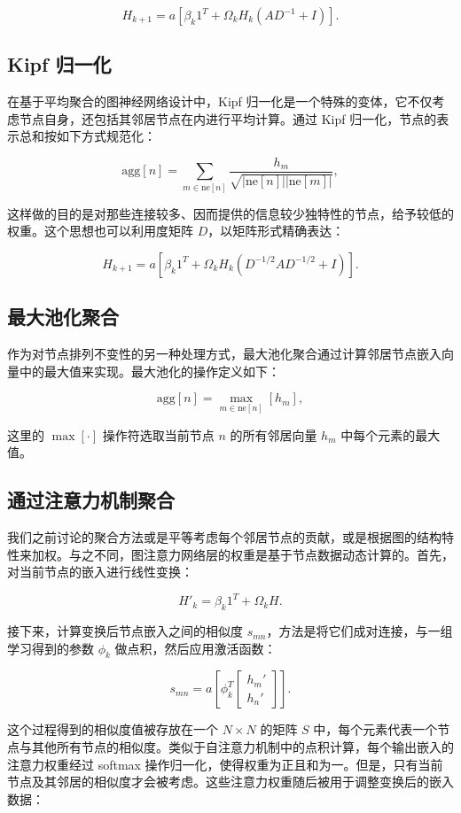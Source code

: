 \[
H_{k+1} = a \left[ \beta_k 1^T + \Omega_k H_k (AD^{-1} + I) \right]. \tag{13.18}
\]
\subsection{Kipf 归一化}
在基于平均聚合的图神经网络设计中，Kipf 归一化是一个特殊的变体，它不仅考虑节点自身，还包括其邻居节点在内进行平均计算。通过 Kipf 归一化，节点的表示总和按如下方式规范化：

\[
\text{agg}[n] = \sum_{m \in \text{ne}[n]} \frac{h_m}{\sqrt{|\text{ne}[n]||\text{ne}[m]|}}, \tag{13.19}
\]

这样做的目的是对那些连接较多、因而提供的信息较少独特性的节点，给予较低的权重。这个思想也可以利用度矩阵 \(D\)，以矩阵形式精确表达：

\[
H_{k+1} = a \left[ \beta_k 1^T + \Omega_k H_k (D^{-1/2} A D^{-1/2} + I) \right]. \tag{13.20}
\]

\subsection{最大池化聚合}
作为对节点排列不变性的另一种处理方式，最大池化聚合通过计算邻居节点嵌入向量中的最大值来实现。最大池化的操作定义如下：

\[
\text{agg}[n] = \max_{m \in \text{ne}[n]} \left[ h_m \right], \tag{13.21}
\]

这里的 \(\max[\cdot]\) 操作符选取当前节点 \(n\) 的所有邻居向量 \(h_m\) 中每个元素的最大值。

\subsection{通过注意力机制聚合}

我们之前讨论的聚合方法或是平等考虑每个邻居节点的贡献，或是根据图的结构特性来加权。与之不同，图注意力网络层的权重是基于节点数据动态计算的。首先，对当前节点的嵌入进行线性变换：

\[
H'_k = \beta_k 1^T + \Omega_k H. \tag{13.22}
\]

接下来，计算变换后节点嵌入之间的相似度 \(s_{mn}\)，方法是将它们成对连接，与一组学习得到的参数 \(\phi_k\) 做点积，然后应用激活函数：

\[
s_{mn} = a \left[ \phi_k^T \left[ \begin{array}{c}
h_m' \\
h_n'
\end{array} \right] \right]. \tag{13.23}
\]

这个过程得到的相似度值被存放在一个 \(N \times N\) 的矩阵 \(S\) 中，每个元素代表一个节点与其他所有节点的相似度。类似于自注意力机制中的点积计算，每个输出嵌入的注意力权重经过 softmax 操作归一化，使得权重为正且和为一。但是，只有当前节点及其邻居的相似度才会被考虑。这些注意力权重随后被用于调整变换后的嵌入数据：

